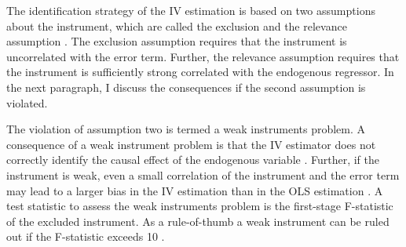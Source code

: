  \par
The identification strategy of the IV estimation is based on two assumptions about the instrument, which are called the exclusion and the relevance assumption \parencite{cameron2009}.
The exclusion assumption requires that the instrument is uncorrelated with the error term. Further, the relevance assumption requires that  the instrument is sufficiently strong correlated with the endogenous regressor.
 In the next paragraph, I discuss the consequences if the second assumption is violated.\par
The violation of assumption two is termed a weak instruments problem.
A consequence of a weak instrument problem is that the IV estimator does not correctly identify the causal effect of the endogenous variable  \parencite{bound}.
Further, if the instrument is weak, even a small correlation of the instrument and the error term may lead to a larger  bias in the IV estimation than in the OLS estimation \parencite{bound}. A test statistic to assess the weak instruments problem is the first-stage F-statistic of the excluded instrument. As a rule-of-thumb a weak instrument can be ruled out if the F-statistic exceeds 10 \parencite{mastering}.    \par

